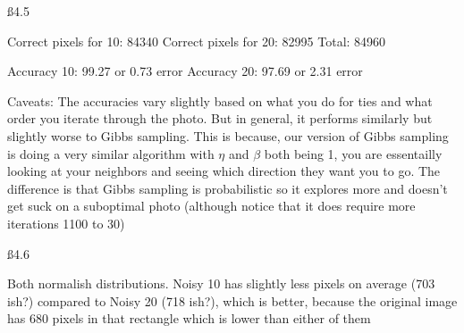 \ss{4.5}

Correct pixels for 10: 84340
Correct pixels for 20: 82995
Total: 84960

Accuracy 10: 99.27 or 0.73 error
Accuracy 20: 97.69 or 2.31 error

Caveats: The accuracies vary slightly based on what you do for ties and what order you iterate through the photo. But in general, it performs similarly but slightly worse to Gibbs sampling. This is because, our version of Gibbs sampling is doing a very similar algorithm with $\eta$ and $\beta$ both being 1, you are essentailly looking at your neighbors and seeing which direction they want you to go. The difference is that Gibbs sampling is probabilistic so it explores more and doesn't get suck on a suboptimal photo (although notice that it does require more iterations 1100 to 30)


\ss{4.6}

Both normalish distributions. Noisy 10 has slightly less pixels on average (703 ish?) compared to Noisy 20 (718 ish?), which is better, because the original image has 680 pixels in that rectangle which is lower than either of them


